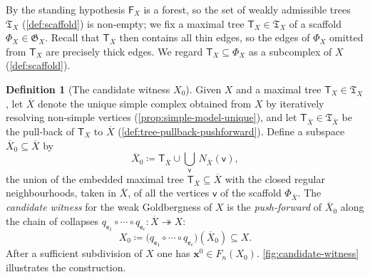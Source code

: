 \documentclass[reqno]{amsart}
\theoremstyle{definition}
\newtheorem{definition}[theorem]{Definition}
\newcommand\bfx{\mathbf{x}}
\newcommand\sfT{\mathsf{T}}
\newcommand\sfe{\mathsf{e}}
\newcommand\sfv{\mathsf{v}}
\newcommand{\base}{\bfx^0}
\renewcommand{\bar}{\overline}
\numberwithin{equation}{section}
\begin{document}
By the standing hypothesis \(\mathsf{F}_X\) is a forest, so the
set of weakly admissible trees \(\mathfrak{T}_X\)
(\cref{def:scaffold}) is non-empty; we fix a
maximal tree \(\sfT_X\in\mathfrak{T}_X\) of a scaffold
\(\Phi_X\in\mathfrak{G}_X\). Recall that \(\sfT_X\) then contains all
thin edges, so the edges of \(\Phi_X\) omitted from \(\sfT_X\) are
precisely thick edges. We regard \(\sfT_X\subseteq\Phi_X\) as a
subcomplex of \(X\) (\cref{def:scaffold}).

\begin{definition}[The candidate witness \(X_0\)]
\label{def:candidate-witness}
Given \(X\) and a maximal tree \(\sfT_X\in\mathfrak{T}_X\), let
\(\bar X\) denote the unique simple complex obtained from \(X\) by
iteratively resolving non-simple vertices
(\cref{prop:simple-model-unique}), and let
\(\sfT_{\bar X}\in\mathfrak{T}_{\bar X}\) be the pull-back of \(\sfT_X\)
to \(\bar X\)
(\cref{def:tree-pullback-pushforward}). Define a
subspace \(\bar X_0\subseteq\bar X\) by
\[
\bar X_0 \coloneqq \sfT_{\bar X}\cup
\bigcup_{\sfv}\,N_{\bar X}(\sfv),
\]
the union of the embedded maximal tree
\(\sfT_{\bar X}\subseteq\bar X\) with the closed regular
neighbourhoods, taken in \(\bar X\), of all the vertices \(\sfv\)
of the scaffold \(\Phi_{\bar X}\). The
\emph{candidate witness} for the weak Goldbergness of \(X\) is
the \emph{push-forward} of \(\bar X_0\) along the chain of
collapses
\(q_{\sfe_1}\circ\cdots\circ q_{\sfe_c}\colon\bar X\twoheadrightarrow X\):
\[
X_0 \coloneqq \bigl(q_{\sfe_1}\circ\cdots\circ q_{\sfe_c}\bigr)(\bar X_0)
\subseteq X.
\]
After a sufficient subdivision of \(X\) one has
\(\base\in F_n(X_0)\). \cref{fig:candidate-witness} illustrates
the construction.
\end{definition}
\end{document}
